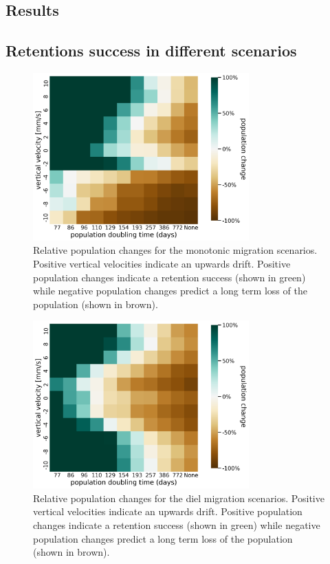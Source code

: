 \documentclass[npg, manuscript]{copernicus}
\begin{document}


\subsection{Results}

\subsection{Retentions success in different scenarios}


\begin{figure}
    \includegraphics[width=8.3cm]{figures/retention_success_sa_mono.png}
    \caption[]{Relative population changes for the monotonic migration scenarios. Positive vertical velocities indicate an upwards drift. Positive population changes indicate a retention success (shown in green) while negative population changes predict a long term loss of the population (shown in brown).}
    \label{fig:monotonic_retention_success}
\end{figure}
\begin{figure}
    \includegraphics[width=8.3cm]{figures/retention_success_sa_diel.png}
    \caption[]{Relative population changes for the diel migration scenarios. Positive vertical velocities indicate an upwards drift. Positive population changes indicate a retention success (shown in green) while negative population changes predict a long term loss of the population (shown in brown).}
    \label{fig:diel_retention_success}
\end{figure}
\end{document}
